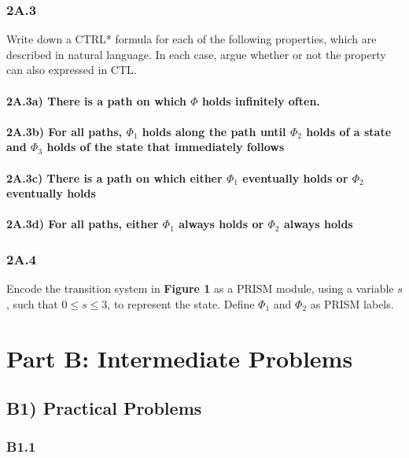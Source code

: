 \documentclass[12pt]{report}
\begin{document}
\subsection*{2A.3}
Write down a CTRL* formula for each of the following properties, which are described in natural language. In each case, argue whether or not the property can also expressed in CTL.

\subsubsection*{2A.3a) There is a path on which $\Phi$ holds infinitely often.}

\subsubsection*{2A.3b) For all paths, $\Phi_1$ holds along the path until $\Phi_2$ holds of a state and $\Phi_3$ holds of the state that immediately follows}

\subsubsection*{2A.3c) There is a path on which either $\Phi_1$ eventually holds or $\Phi_2$ eventually holds}

\subsubsection*{2A.3d) For all paths, either $\Phi_1$ always holds or $\Phi_2$ always holds}

\subsection*{2A.4}
Encode the transition system in \textbf{Figure 1} as a PRISM module, using a variable $s$, such that $0 \leq s \leq 3$, to represent the state. Define $\Phi_1$ and $\Phi_2$ as PRISM labels.

\chapter*{Part B: Intermediate Problems}
\section*{B1) Practical Problems}
\subsection*{B1.1 }
\end{document}
